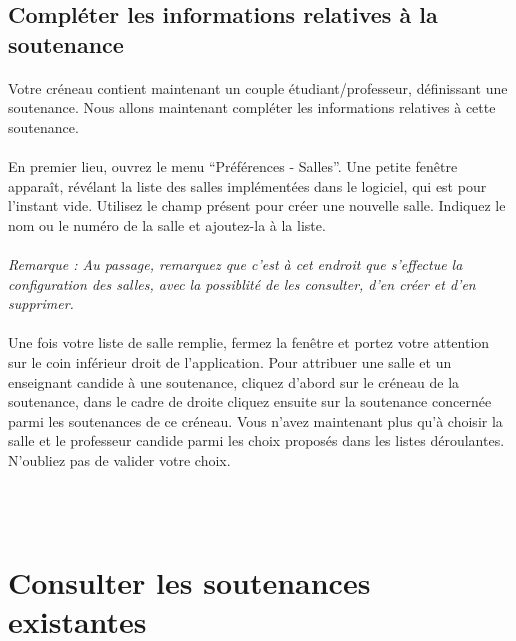 \documentclass[a4paper,10pt]{report}
\begin{document}
	  
	  
	
      \subsection{Compléter les informations relatives à la soutenance}
	\paragraph{}
	  Votre créneau contient maintenant un couple étudiant/professeur, définissant une soutenance.
	  Nous allons maintenant compléter les informations relatives à cette soutenance.
	 
	\paragraph{}
	  En premier lieu, ouvrez le menu ``Préférences - Salles''. 
	  Une petite fenêtre apparaît, révélant la liste des salles implémentées dans le logiciel, qui est pour l'instant vide.
	  Utilisez le champ présent pour créer une nouvelle salle.
	  Indiquez le nom ou le numéro de la salle et ajoutez-la à la liste.
	  
	\paragraph{}  
	  \textit{Remarque : Au passage, remarquez que c'est à cet endroit que s'effectue la configuration des salles, avec la possiblité de les consulter, d'en créer et d'en supprimer.}
	  
	\paragraph{}
	  Une fois votre liste de salle remplie, fermez la fenêtre et portez votre attention sur le coin inférieur droit de l'application.
	  Pour attribuer une salle et un enseignant candide à une soutenance, cliquez d'abord sur le créneau de la soutenance, dans le cadre de droite cliquez ensuite sur la soutenance concernée parmi les soutenances de ce créneau.
	  Vous n'avez maintenant plus qu'à choisir la salle et le professeur candide parmi les choix proposés dans les listes déroulantes.
	  N'oubliez pas de valider votre choix.
	  
	
	~\\~\\
    \section{Consulter les soutenances existantes}
\end{document}
